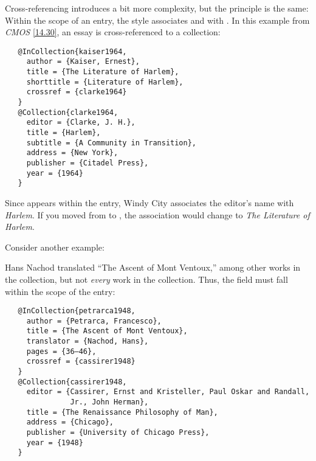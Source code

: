 \documentclass[11pt,letterpaper,oneside]{article}
\begin{document}
Cross-referencing introduces a bit more complexity, but the principle
is the same: Within the scope of an entry, the style associates
 and  with . In
this example from \textit{CMOS} \ref{14.30}, an essay is
cross-referenced to a collection:

\begin{verbatim}
   @InCollection{kaiser1964,
     author = {Kaiser, Ernest},
     title = {The Literature of Harlem},
     shorttitle = {Literature of Harlem},
     crossref = {clarke1964}
   }
   @Collection{clarke1964,
     editor = {Clarke, J. H.},
     title = {Harlem},
     subtitle = {A Community in Transition},
     address = {New York},
     publisher = {Citadel Press},
     year = {1964}
   }
\end{verbatim}

\begin{citebib}
\item \cite{kaiser1964}
\end{citebib}

\noindent Since  appears within the
 entry, Windy City associates the editor's name
with \textit{Harlem}. If you moved  from
 to , the association would
change to \textit{The Literature of Harlem}.

Consider another example:

\begin{citebib}
\item \cite{petrarca1948}
\end{citebib}

\noindent Hans Nachod translated ``The Ascent of Mont Ventoux,'' among
other works in the collection, but not \textit{every} work in the
collection. Thus, the  field must fall within the
scope of the  entry:

\begin{verbatim}
   @InCollection{petrarca1948,
     author = {Petrarca, Francesco},
     title = {The Ascent of Mont Ventoux},
     translator = {Nachod, Hans},
     pages = {36–46},
     crossref = {cassirer1948}
   }
   @Collection{cassirer1948,
     editor = {Cassirer, Ernst and Kristeller, Paul Oskar and Randall,
               Jr., John Herman},
     title = {The Renaissance Philosophy of Man},
     address = {Chicago},
     publisher = {University of Chicago Press},
     year = {1948}
   }
\end{verbatim}
\end{document}
